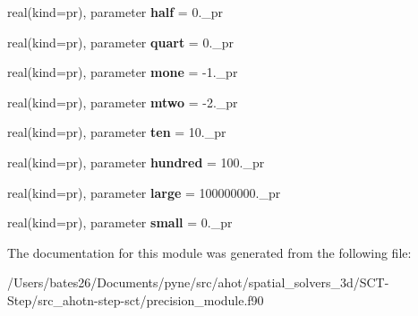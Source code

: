 \begin{DoxyCompactItemize}
\item 
\hypertarget{classprecision__module_a2975299bd4cad0c5fc29b217c7a3c55a}{real(kind=pr), parameter {\bfseries half} = 0.\+\_\+pr}\label{classprecision__module_a2975299bd4cad0c5fc29b217c7a3c55a}

\item 
\hypertarget{classprecision__module_a0517b994d0f7952d498a1242fb834718}{real(kind=pr), parameter {\bfseries quart} = 0.\+\_\+pr}\label{classprecision__module_a0517b994d0f7952d498a1242fb834718}

\item 
\hypertarget{classprecision__module_aa814d5147dc4064661bf0010f9ee044f}{real(kind=pr), parameter {\bfseries mone} = -\/1.\+\_\+pr}\label{classprecision__module_aa814d5147dc4064661bf0010f9ee044f}

\item 
\hypertarget{classprecision__module_ab2bbff5634ef6e43b944fa5dbaa013c3}{real(kind=pr), parameter {\bfseries mtwo} = -\/2.\+\_\+pr}\label{classprecision__module_ab2bbff5634ef6e43b944fa5dbaa013c3}

\item 
\hypertarget{classprecision__module_a8c8a6d6ed3f94ec0e37884f3f2b3700c}{real(kind=pr), parameter {\bfseries ten} = 10.\+\_\+pr}\label{classprecision__module_a8c8a6d6ed3f94ec0e37884f3f2b3700c}

\item 
\hypertarget{classprecision__module_a391d84726af18dbfd50c69c1292499ab}{real(kind=pr), parameter {\bfseries hundred} = 100.\+\_\+pr}\label{classprecision__module_a391d84726af18dbfd50c69c1292499ab}

\item 
\hypertarget{classprecision__module_af2e8673d0687c8aec5af0efa8b6d4060}{real(kind=pr), parameter {\bfseries large} = 100000000.\+\_\+pr}\label{classprecision__module_af2e8673d0687c8aec5af0efa8b6d4060}

\item 
\hypertarget{classprecision__module_ae2f943dd65cbd67271dcbd024d72b834}{real(kind=pr), parameter {\bfseries small} = 0.\+\_\+pr}\label{classprecision__module_ae2f943dd65cbd67271dcbd024d72b834}

\end{DoxyCompactItemize}


The documentation for this module was generated from the following file\+:\begin{DoxyCompactItemize}
\item 
/\+Users/bates26/\+Documents/pyne/src/ahot/spatial\+\_\+solvers\+\_\+3d/\+S\+C\+T-\/\+Step/src\+\_\+ahotn-\/step-\/sct/precision\+\_\+module.\+f90\end{DoxyCompactItemize}
